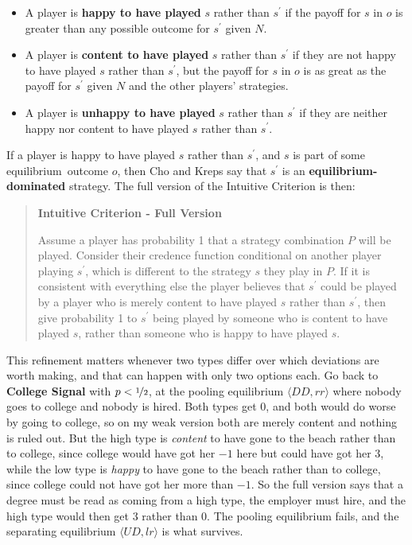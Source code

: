 \documentclass[
  11pt,
  letterpaper,
]{scrbook}
\providecommand{\tightlist}{%
  \setlength{\itemsep}{0pt}\setlength{\parskip}{0pt}}
\begin{document}
\begin{itemize}
\tightlist
\item
  A player is \textbf{happy to have played} \(s\) rather than
  \(s^\prime\) if the payoff for \(s\) in \(o\) is greater than any
  possible outcome for \(s^\prime\) given \(N\).
\item
  A player is \textbf{content to have played} \(s\) rather than
  \(s^\prime\) if they are not happy to have played \(s\) rather than
  \(s^\prime\), but the payoff for \(s\) in \(o\) is as great as the
  payoff for \(s^\prime\) given \(N\) and the other players' strategies.
\item
  A player is \textbf{unhappy to have played} \(s\) rather than
  \(s^\prime\) if they are neither happy nor content to have played
  \(s\) rather than \(s^\prime\).
\end{itemize}

If a player is happy to have played \(s\) rather than \(s^\prime\), and
\(s\) is part of some equilibrium~outcome \(o\), then Cho and Kreps say
that \(s^\prime\) is an \textbf{equilibrium-dominated} strategy. The
full version of the Intuitive Criterion is then:

\begin{quote}
\textbf{Intuitive Criterion - Full Version}

Assume a player has probability 1 that a strategy combination \(P\) will
be played. Consider their credence function conditional on another
player playing \(s^\prime\), wh\-ich is different to the strategy \(s\)
they play in \(P\). If it is consistent with everything else the player
believes that \(s^\prime\) could be played by a player who is merely
content to have played \(s\) rather than \(s^\prime\), then give
probability 1 to \(s^\prime\) being played by someone who is content to
have played \(s\), rather than someone who is happy to have played
\(s\).
\end{quote}

This refinement matters whenever two types differ over which deviations
are worth making, and that can happen with only two options each. Go
back to \textbf{College Signal} with \(p < \nicefrac{1}{2}\), at the
pooling equilibrium \(\langle DD, rr \rangle\) where nobody goes to
college and nobody is hired. Both types get 0, and both would do worse
by going to college, so on my weak version both are merely content and
nothing is ruled out. But the high type is \emph{content} to have gone
to the beach rather than to college, since college would have got her
\(-1\) here but could have got her 3, while the low type is \emph{happy}
to have gone to the beach rather than to college, since college could
not have got her more than \(-1\). So the full version says that a
degree must be read as coming from a high type, the employer must hire,
and the high type would then get 3 rather than 0. The pooling
equilibrium fails, and the separating equilibrium
\(\langle UD, lr \rangle\) is what survives.
\end{document}
